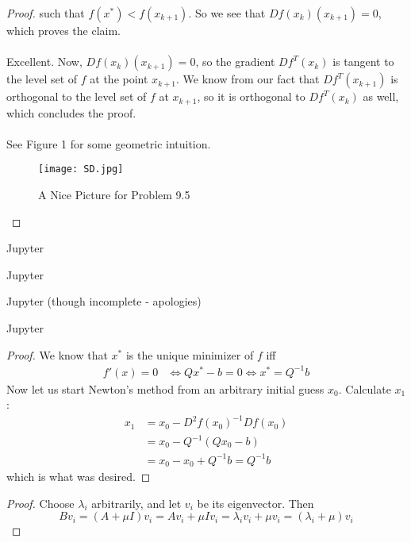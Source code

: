 \documentclass[12pt]{article}
\newenvironment{problem}[2][Problem]{\begin{trivlist}
\item[\hskip \labelsep {\bfseries #1}\hskip \labelsep {\bfseries #2.}]}{\end{trivlist}}
\theoremstyle{definition}
\theoremstyle{definition}
\theoremstyle{definition}
\theoremstyle{definition}
\begin{document}
\begin{problem}{9.5}
\begin{proof}
such that $f(x^*) < f(x_{k+1})$. So we see that $Df(x_k)(x_{k+1}) = 0$, which proves the claim. \\
\\
Excellent. Now, $Df(x_k)(x_{k+1}) = 0$, so the gradient $Df^T(x_k)$ is tangent to the level set of $f$ at the point $x_{k+1}$. We know from our fact that $Df^T(x_{k+1})$ is orthogonal to the level set of $f$ at $x_{k+1}$, so it is orthogonal to $Df^T(x_k)$ as well, which concludes the proof. \\
\\
See Figure 1  for some geometric intuition. \\
\begin{figure} 
\centering
\texttt{[image: SD.jpg]}
\caption{A Nice Picture for Problem 9.5}
\label{fig:boat1}
\end{figure}
\end{proof}
\end{problem}

\begin{problem}{9.6}
Jupyter
\end{problem}

\begin{problem}{9.7}
Jupyter
\end{problem}

\begin{problem}{9.8}
Jupyter (though incomplete - apologies)
\end{problem}

\begin{problem}{9.9}
Jupyter 
\end{problem}

\begin{problem}{9.10} 
\begin{proof}
We know that $x^*$ is the unique minimizer of $f$ iff 
\begin{align*}
f'(x) = 0 &\iff Qx^* - b = 0 \iff x^* = Q^{-1}b 
\end{align*}
Now let us start Newton's method from an arbitrary initial guess $x_0$. Calculate $x_1$:
\begin{align*}
x_1 &= x_0 - D^2f(x_0)^{-1}Df(x_0) \\
&= x_0 - Q^{-1} (Qx_0 - b) \\
&= x_0 - x_0 + Q^{-1}b = Q^{-1}b
\end{align*}
which is what was desired.
\end{proof}
\end{problem}

\begin{problem}{9.12}
\begin{proof}
Choose $\lambda_i$ arbitrarily, and let $v_i$ be its eigenvector. Then
$$
Bv_i = (A + \mu I)v_i = Av_i + \mu I v_i = \lambda_i v_i + \mu v_i = (\lambda_i + \mu) v_i
$$
\end{proof}
\end{problem}
\end{document}
